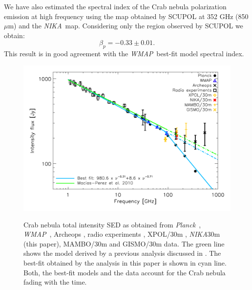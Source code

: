 \documentclass[twocolumn,traditabstract]{aa}
\def\NIKA{\textit{NIKA}}
\def\Planck{\textit{Planck}}
\def\WMAP{\textit{WMAP}}
\begin{document}
We have also estimated the spectral index of the Crab nebula polarization
emission at high frequency using the map obtained by SCUPOL \citep{scubapol} at 352 GHz (850
$\mu$m) and the \NIKA\ map. Considering only the region observed by SCUPOL we
obtain:
\begin{equation}
\beta_p = -0.33 \pm 0.01.
\end{equation}
This result is in good agreement with the \WMAP\ best-fit model spectral index.

\begin{figure}
  \centering
          { \includegraphics[width=1\linewidth,keepaspectratio]{figures/Crab_SED_i_150.pdf}}
           \caption{Crab nebula total intensity SED as obtained from \Planck\ \citep{2015arXiv150702058P}, \WMAP\ \citep{2011ApJS..192...19W}, Archeops \citep{macias2007archeops}, radio experiments \citep{dmitrenko1970absolute, 1971IzVUZ..14..157V}, XPOL/30m \citep{aumont2010}, \NIKA\/30m (this paper), MAMBO/30m \citep{2002A&A...386.1044B} and GISMO/30m \citep{2011ApJ...734...54A} data. The green line shows the model derived by a previous analysis discussed in \citep{macias2010}. The best-fit obtained by the analysis in this paper is shown in cyan line. Both, the best-fit models and the data account for the Crab nebula fading with the time.}
\label{crab_SED}		
  \end{figure} 
\end{document}
